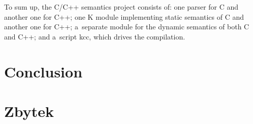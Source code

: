 \documentclass{fithesis3}
\begin{document}
To sum up, the C/C++ semantics project consists of: one parser for C and another one for C++; one K module implementing static semantics of C and another one for C++; a~separate module for the dynamic semantics of both C and C++; and a~script kcc, which drives the compilation.










\chapter{Conclusion}
	
\chapter{Zbytek}
\end{document}
